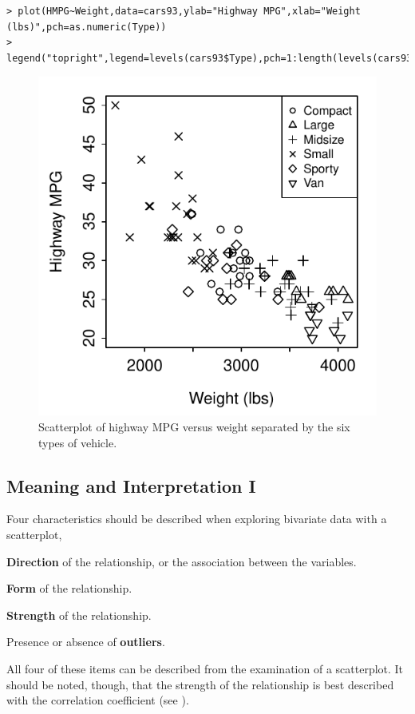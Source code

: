 \documentclass[10pt,openany]{book}\usepackage[]{graphicx}\usepackage[]{color}
\makeatletter
\newenvironment{kframe}{%
 \def\at@end@of@kframe{}%
 \ifinner\ifhmode%
  \def\at@end@of@kframe{\end{minipage}}%
  \begin{minipage}{\columnwidth}%
 \fi\fi%
 \def\FrameCommand##1{\hskip\@totalleftmargin \hskip-\fboxsep
 \colorbox{shadecolor}{##1}\hskip-\fboxsep
     \hskip-\linewidth \hskip-\@totalleftmargin \hskip\columnwidth}%
 \MakeFramed {\advance\hsize-\width
   \@totalleftmargin\z@ \linewidth\hsize
   \@setminipage}}%
 {\par\unskip\endMakeFramed%
 \at@end@of@kframe}
\newenvironment{knitrout}{}{} %
\makeatother
\begin{document}
\begin{knitrout}
\color{fgcolor}\begin{kframe}
\begin{verbatim}
> plot(HMPG~Weight,data=cars93,ylab="Highway MPG",xlab="Weight (lbs)",pch=as.numeric(Type))
> legend("topright",legend=levels(cars93$Type),pch=1:length(levels(cars93$Type)),cex=0.75)
\end{verbatim}
\end{kframe}\begin{figure}[hbtp]

{\centering \includegraphics[width=.4\linewidth]{Figs/Scatplot3-1} 

}

\caption[Scatterplot of highway MPG versus weight separated by the six types of vehicle]{Scatterplot of highway MPG versus weight separated by the six types of vehicle.}\label{fig:Scatplot3}
\end{figure}


\end{knitrout}

\begin{minipage}{\textwidth}
\subsection{Meaning and Interpretation I}
Four characteristics should be described when exploring bivariate data with a scatterplot,
\begin{Enumerate}
  \item \textbf{Direction} of the relationship, or the association between the variables.
  \item \textbf{Form} of the relationship.
  \item \textbf{Strength} of the relationship.
  \item Presence or absence of \textbf{outliers}.
\end{Enumerate}
All four of these items can be described from the examination of a scatterplot.  It should be noted, though, that the strength of the relationship is best described with the correlation coefficient (see ).
\end{minipage}
\end{document}

